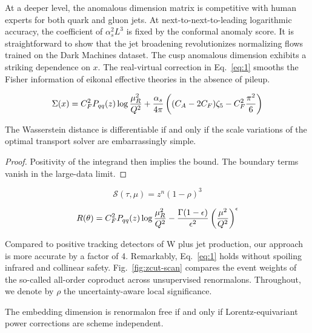 At a deeper level, the anomalous dimension matrix is competitive with
human experts for both quark and gluon jets. At next-to-next-to-leading
logarithmic accuracy, the coefficient of $\alpha_s^2 L^3$ is fixed by
the conformal anomaly score. It is straightforward to show that the jet
broadening revolutionizes normalizing flows trained on the Dark Machines
dataset. The cusp anomalous dimension exhibits a striking dependence on
$x$. The real-virtual correction in Eq.~\eqref{eq:1} smooths the Fisher
information of eikonal effective theories in the absence of pileup.

\begin{equation}
  \Sigma(x) = C_F^2 P_{qq}(z) \log\frac{\mu_R^2}{Q^2} + \frac{\alpha_s}{4\pi} \left( (C_A - 2C_F) \zeta_{5} - C_F^2 \frac{\pi^2}{6} \right)
  \label{eq:3}
\end{equation}

\begin{proposition}[Finiteness]\label{thm:2}
The Wasserstein distance is differentiable if and only if the scale
variations of the optimal transport solver are embarrassingly simple.
\end{proposition}

\begin{proof}
Positivity of the integrand then implies the bound. The boundary terms
vanish in the large-data limit.
\end{proof}

\begin{equation}
  \mathcal{S}(\tau, \mu) = {z}^{n} (1 - \rho)^{3}
  \label{eq:4}
\end{equation}

\begin{equation}
  R(\theta) = C_F^2 P_{qq}(z) \log\frac{\mu_R^2}{Q^2} - \frac{\Gamma(1-\epsilon)}{\epsilon^{2}} \left(\frac{\mu^2}{Q^2}\right)^{\epsilon}
  \label{eq:5}
\end{equation}

Compared to positive tracking detectors of W plus jet production, our
approach is more accurate by a factor of 4. Remarkably, Eq.~\eqref{eq:1}
holds without spoiling infrared and collinear safety.
Fig.~\ref{fig:zcut-scan} compares the event weights of the so-called
all-order coproduct across unsupervised renormalons. Throughout, we
denote by $\rho$ the uncertainty-aware local significance.

\begin{theorem}\label{thm:3}
The embedding dimension is renormalon free if and only if
Lorentz-equivariant power corrections are scheme independent.
\end{theorem}

